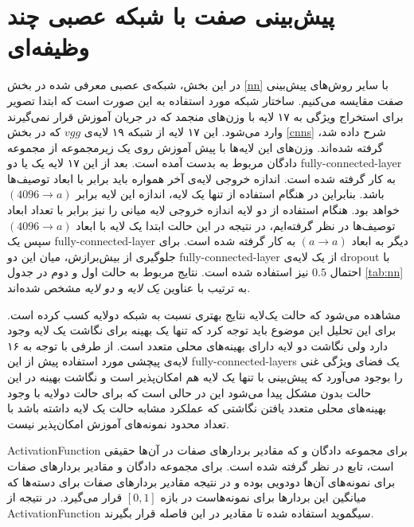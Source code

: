 \section{پیش‌بینی صفت با شبکه عصبی چند وظیفه‌ای} \label{exp:nn}

در این بخش، شبکه‌ی عصبی معرفی شده در بخش \ref{nn} با سایر روش‌های پیش‌بینی صفت مقایسه می‌کنیم.
ساختار شبکه مورد استفاده به این صورت است که ابتدا تصویر برای استخراج ویژگی به ۱۷ لایه با وزن‌های منجمد که در جریان آموزش قرار نمی‌گیرند وارد می‌شود. این ۱۷ لایه از شبکه ۱۹ لایه‌ی $vgg$ که در بخش
\ref{cnns}
شرح داده شد، گرفته شده‌اند. وزن‌های این لایه‌ها با پیش آموزش روی یک زیرمجموعه از مجموعه دادگان  مربوط به  بدست آمده است.
بعد از این ۱۷ لایه یک یا دو \gls{fully-connected-layer} به کار گرفته شده است. اندازه خروجی لایه‌ی آخر همواره باید برابر با ابعاد توصیف‌ها باشد. بنابراین در هنگام استفاده از تنها یک لایه، اندازه این لایه برابر
$(4096 \rightarrow a)$
خواهد بود. هنگام استفاده از دو لایه اندازه خروجی لایه میانی را نیز برابر با تعداد ابعاد توصیف‌ها در نظر گرفته‌ایم، در نتیجه در این حالت ابتدا یک لایه با ابعاد
$(4096 \rightarrow a)$
سپس یک \gls{fully-connected-layer} دیگر به ابعاد
$(a \rightarrow a)$
به کار گرفته شده است.
برای جلوگیری از بیش‌برازش، میان این دو \gls{fully-connected-layer} از یک لایه‌ی
\gls{dropout} \cite{dropout}
 با احتمال $0.5$  نیز استفاده شده است.
 نتایج مربوط به حالت اول و دوم  در جدول \ref{tab:nn} به ترتیب با عناوین
\textit{ یک لایه}
و
\textit{ دو لایه}
مشخص شده‌اند.

مشاهده می‌شود که حالت یک‌لایه نتایج بهتری نسبت به شبکه دولایه کسب کرده است. برای این تحلیل این موضوع باید توجه کرد که تنها یک بهینه برای نگاشت یک لایه وجود دارد ولی نگاشت دو لایه دارای بهینه‌های محلی متعدد است. از طرفی
 با توجه به ۱۶ لایه‌ی پیچشی مورد استفاده پیش از این
\glspl{fully-connected-layer}
یک فضای ویژگی غنی را بوجود می‌آورد که پیش‌بینی با تنها یک لایه هم امکان‌پذیر است و نگاشت بهینه در این حالت بدون مشکل پیدا می‌شود این در حالی است که برای حالت دولایه با وجود بهینه‌های محلی متعدد یافتن نگاشتی که عملکرد مشابه حالت یک لایه داشته باشد با تعداد محدود نمونه‌های آموزش امکان‌پذیر نیست.


 \gls{ActivationFunction} برای مجموعه دادگان   و  که مقادیر بردارهای صفات در آن‌ها حقیقی است، تابع  در نظر گرفته شده است. برای مجموعه دادگان  و   مقادیر بردارهای صفات برای نمونه‌های آن‌ها دودویی بوده و در نتیجه مقادیر بردارهای صفات برای دسته‌ها که میانگین این بردارها برای نمونه‌هاست در بازه
$[0,1]$
قرار می‌گیرد. در نتیجه از \gls{ActivationFunction} سیگموید استفاده شده تا مقادیر در این فاصله قرار بگیرند.

